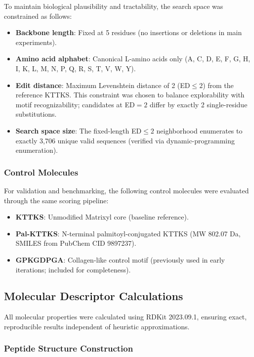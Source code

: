 \documentclass[11pt,a4paper]{article}
\begin{document}
To maintain biological plausibility and tractability, the search space was constrained as follows:
\begin{itemize}
  \item \textbf{Backbone length}: Fixed at 5 residues (no insertions or deletions in main experiments).
  \item \textbf{Amino acid alphabet}: Canonical L-amino acids only (A, C, D, E, F, G, H, I, K, L, M, N, P, Q, R, S, T, V, W, Y).
  \item \textbf{Edit distance}: Maximum Levenshtein distance of 2 (ED$\leq 2$) from the reference KTTKS. This constraint was chosen to balance explorability with motif recognizability; candidates at ED$=2$ differ by exactly 2 single-residue substitutions.
  \item \textbf{Search space size}: The fixed-length ED$\leq 2$ neighborhood enumerates to exactly 3,706 unique valid sequences (verified via dynamic-programming enumeration).
\end{itemize}

\subsubsection{Control Molecules}

For validation and benchmarking, the following control molecules were evaluated through the same scoring pipeline:
\begin{itemize}
  \item \textbf{KTTKS}: Unmodified Matrixyl core (baseline reference).
  \item \textbf{Pal-KTTKS}: N-terminal palmitoyl-conjugated KTTKS (MW 802.07 Da, SMILES from PubChem CID 9897237).
  \item \textbf{GPKGDPGA}: Collagen-like control motif (previously used in early iterations; included for completeness).
\end{itemize}

\subsection{Molecular Descriptor Calculations}

All molecular properties were calculated using RDKit 2023.09.1, ensuring exact, reproducible results independent of heuristic approximations.

\subsubsection{Peptide Structure Construction}
\end{document}
